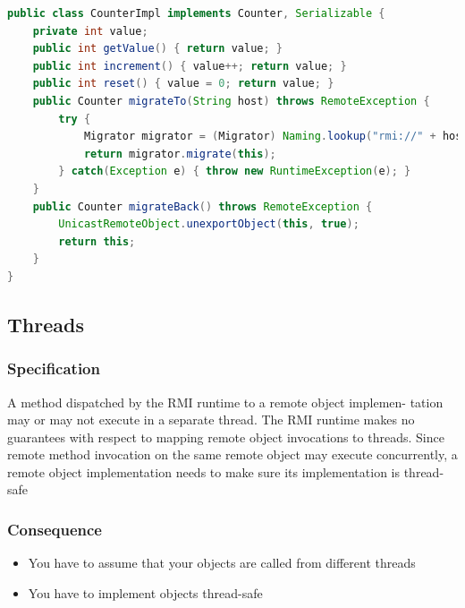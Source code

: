 \documentclass[10pt]{article}
\begin{document}
\begin{lstlisting}[language=Java, caption=Counter implementation, style=JavaStyle]
public class CounterImpl implements Counter, Serializable { 
	private int value;
	public int getValue() { return value; }
	public int increment() { value++; return value; } 
	public int reset() { value = 0; return value; }
	public Counter migrateTo(String host) throws RemoteException {
		try {
			Migrator migrator = (Migrator) Naming.lookup("rmi://" + host + "/Migrator");
			return migrator.migrate(this);
		} catch(Exception e) { throw new RuntimeException(e); }
	}
	public Counter migrateBack() throws RemoteException {
		UnicastRemoteObject.unexportObject(this, true); 
		return this;
	}
}
\end{lstlisting}
\subsection{Threads}
\subsubsection{Specification}
A method dispatched by the RMI runtime to a remote object implemen- tation may or may not execute in a separate thread. The RMI runtime makes no guarantees with respect to mapping remote object invocations to threads. Since remote method invocation on the same remote object may execute concurrently, a remote object implementation needs to make sure its implementation is thread-safe \\
\subsubsection{Consequence}
\begin{itemize}
	\item You have to assume that your objects are called from different threads
	\item You have to implement objects thread-safe
\end{itemize}
\end{document}
